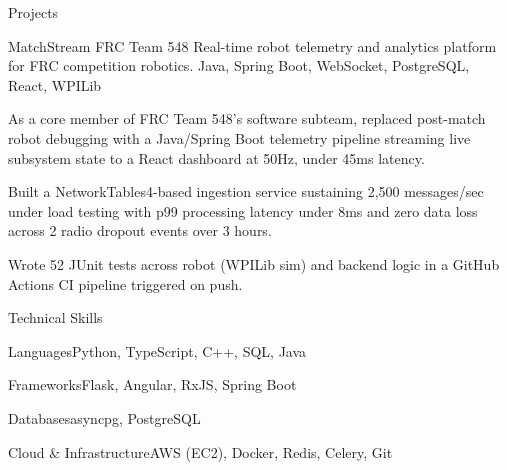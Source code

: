 \documentclass[
	11pt
]{../../../template}
\begin{document}
	\begin{rSection}{P}{rojects}
		\begin{rSectionEntry}
			{MatchStream}
			{FRC Team 548}
			{Real-time robot telemetry and analytics platform for FRC competition robotics.}
			{Java, Spring Boot, WebSocket, PostgreSQL, React, WPILib}
			{}

			\item As a core member of FRC Team 548's software subteam, replaced post-match robot debugging with a Java/Spring Boot telemetry pipeline streaming live subsystem state to a React dashboard at 50Hz, under 45ms latency.
			\item Built a NetworkTables4-based ingestion service sustaining 2,500 messages/sec under load testing with p99 processing latency under 8ms and zero data loss across 2 radio dropout events over 3 hours.
			\item Wrote 52 JUnit tests across robot (WPILib sim) and backend logic in a GitHub Actions CI pipeline triggered on push.
		\end{rSectionEntry}
	\end{rSection}

	\begin{rSection}{T}{echnical Skills}
		\begin{rSet}{Languages}{Python, TypeScript, C++, SQL, Java}
		\end{rSet}
		\begin{rSet}{Frameworks}{Flask, Angular, RxJS, Spring Boot}
		\end{rSet}
		\begin{rSet}{Databases}{asyncpg, PostgreSQL}
		\end{rSet}
		\begin{rSet}{Cloud \& Infrastructure}{AWS (EC2), Docker, Redis, Celery, Git}
		\end{rSet}
	\end{rSection}
\end{document}
